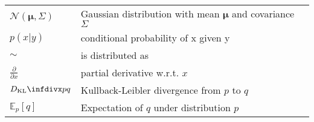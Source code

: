 \begin{tabular}[h]{@{} p{} p{} @{}}
$\mathcal{N}(\mathbf{\mu}, \Sigma)$ & Gaussian distribution with mean $\mathbf{\mu}$ and covariance $\Sigma$ \\
$p(x \vert y)$ & conditional probability of x given y \\
$\sim$ & is distributed as \\
$\frac{\partial}{\partial x}$ & partial derivative w.r.t. $x$ \\
$\dkl{p}{q}$ & Kullback-Leibler divergence from $p$ to $q$ \\
$\mathbb{E}_{p}[q]$ & Expectation of $q$ under distribution $p$
\end{tabular}

